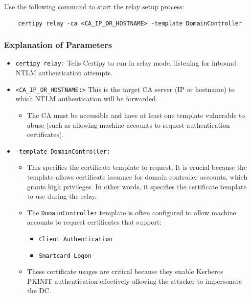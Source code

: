 Use the following command to start the relay setup process:
\begin{notebox}
\begin{verbatim}
    certipy relay -ca <CA_IP_OR_HOSTNAME> -template DomainController
\end{verbatim}
\end{notebox}
\subsubsection{Explanation of Parameters}
\begin{itemize}
    \item \verb|certipy relay:| Tells Certipy to run in relay mode, listening for inbound NTLM authentication attempts.
    \item \verb|<CA_IP_OR_HOSTNAME:>| This is the target CA server (IP or hostname) to which NTLM authentication will be forwarded.
    \begin{itemize}
        \item The CA must be accessible and have at least one template vulnerable to abuse (such as allowing machine accounts to request authentication certificates).
    \end{itemize}
    \item \verb|-template DomainController:|
    \begin{itemize}
        \item This specifies the certificate template to request. It is crucial because the template allows certificate issuance for domain controller accounts, which grants high privileges. In other words, it specifies the certificate template to use during the relay.
        \item The \verb|DomainController| template is often configured to allow machine accounts to request certificates that support:
        \begin{itemize}
            \item \texttt{Client Authentication}
            \item \texttt{Smartcard Logon}
        \end{itemize}
    \item These certificate usages are critical because they enable Kerberos PKINIT authentication-effectively allowing the attacker to impersonate the DC.
    \end{itemize}
\end{itemize}

